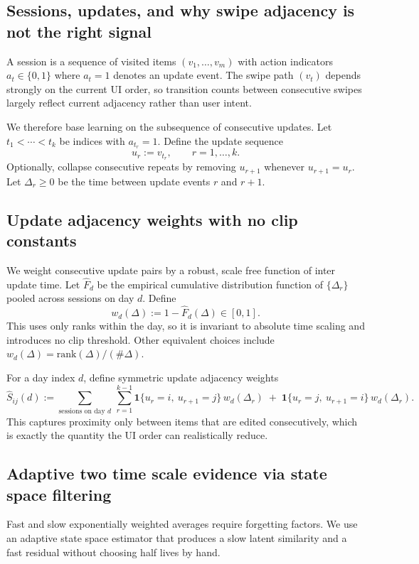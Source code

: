 \documentclass[11pt]{article}
\begin{document}
\subsection{Sessions, updates, and why swipe adjacency is not the right signal}
A session is a sequence of visited items $(v_1,\dots,v_m)$ with action indicators $a_t\in\{0,1\}$ where $a_t=1$ denotes an update event.
The swipe path $(v_t)$ depends strongly on the current UI order, so transition counts between consecutive swipes largely reflect current adjacency rather than user intent.

We therefore base learning on the subsequence of consecutive updates.
Let $t_1<\cdots<t_k$ be indices with $a_{t_r}=1$.
Define the update sequence
\[
u_r := v_{t_r},\qquad r=1,\dots,k.
\]
Optionally, collapse consecutive repeats by removing $u_{r+1}$ whenever $u_{r+1}=u_r$.
Let $\Delta_r\ge 0$ be the time between update events $r$ and $r+1$.

\subsection{Update adjacency weights with no clip constants}
We weight consecutive update pairs by a robust, scale free function of inter update time.
Let $\widehat{F}_d$ be the empirical cumulative distribution function of $\{\Delta_r\}$ pooled across sessions on day $d$.
Define
\[
w_d(\Delta):=1-\widehat{F}_d(\Delta)\in[0,1].
\]
This uses only ranks within the day, so it is invariant to absolute time scaling and introduces no clip threshold.
Other equivalent choices include $w_d(\Delta)=\mathrm{rank}(\Delta)/(\#\Delta)$.

For a day index $d$, define symmetric update adjacency weights
\[
\widehat{S}_{ij}(d)
:=
\sum_{\text{sessions on day }d}\ \sum_{r=1}^{k-1}
\mathbf{1}\{u_r=i,\ u_{r+1}=j\}\,w_d(\Delta_r)
\;+\;
\mathbf{1}\{u_r=j,\ u_{r+1}=i\}\,w_d(\Delta_r).
\]
This captures proximity only between items that are edited consecutively, which is exactly the quantity the UI order can realistically reduce.

\subsection{Adaptive two time scale evidence via state space filtering}
Fast and slow exponentially weighted averages require forgetting factors.
We use an adaptive state space estimator that produces a slow latent similarity and a fast residual without choosing half lives by hand.
\end{document}
